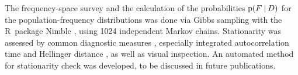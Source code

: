 \documentclass[a4paper,12pt,%
onecolumn,oneside,article,%
british%
]{memoir}
\theoremstyle{remark}
\theoremstyle{innote}
\newcommand*{\wrench}{{\fontencoding{U}\fontfamily{fontawesomethree}\selectfont\symbol{114}}}
\newcommand*{\pencil}{{\fontencoding{U}\fontfamily{fontawesometwo}\selectfont\symbol{210}}}
\newcommand{\mynotew}[1]{{\footnotesize\color{notecolour}\wrench\ #1}}
\newcommand{\mynotep}[1]{{\footnotesize\color{notecolour}\pencil\ #1}}
\newcommand*{\p}{\mathrm{p}}%
\renewcommand*{\|}[1][]{\nonscript\:#1\vert\nonscript\:\mathopen{}}
\newcommand*{\sect}{\S}%
\newcommand*{\sects}{\S\S}%
\newcommand*{\chap}{ch.}%
\newcommand*{\eg}{{e.g.}}
\begin{document}
The frequency-space survey and the calculation of the probabilities $\p(F\|D)$ for the population-frequency distributions was done via Gibbs sampling \autocites[\chap~4]{neal1993}[\sect\,29.5]{mackay1995_r2005}{casellaetal1992} with the R~package Nimble \autocites{nimble2016_r2021}, using 1024 independent Markov chains. Stationarity was assessed by common diagnostic measures \autocites{gilksetal1998}, especially integrated autocorrelation time \autocites{christenetal2010} and Hellinger distance \autocites{booneetal2014}, as well as visual inspection. An automated method for stationarity check was developed, to be discussed in future publications.





\end{document}
